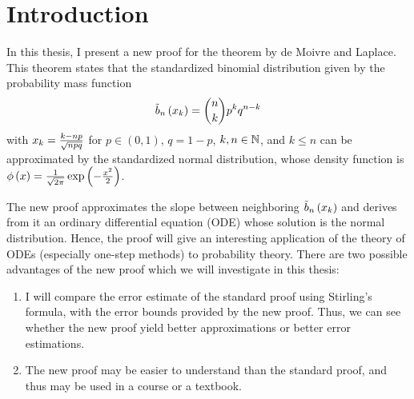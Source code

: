 \chapter{Introduction}

In this thesis, I present a new proof for the theorem by de Moivre and Laplace. This theorem states that the standardized binomial distribution given by the probability mass function
\begin{align}
  \bb{\x} = \binom nk p^k q^{n-k}
\end{align}
with $\x[k] = \frac{k-np}{\sqrt{npq}}$ for $p\in (0,1)$, $q=1-p$, $k,n\in\N$, and $k\le n$ can be approximated by the standardized normal distribution, whose density function is $\fphi{x} = \frac{1}{\sqrt {2\pi}} \fexp{-\frac{x^2}2}$.

The new proof approximates the slope between neighboring $\bb{\x}$ and derives from it an ordinary differential equation (ODE) whose solution is the normal distribution. Hence, the proof will give an interesting application of the theory of ODEs (especially one-step methods) to probability theory. There are two possible advantages of the new proof which we will investigate in this thesis:

\begin{enumerate}
  \item I will compare the error estimate of the standard proof using Stirling's formula, with the error bounds provided by the new proof. Thus, we can see whether the new proof yield better approximations or better error estimations.

  \item The new proof may be easier to understand than the standard proof, and thus may be used in a course or a textbook.
\end{enumerate}
